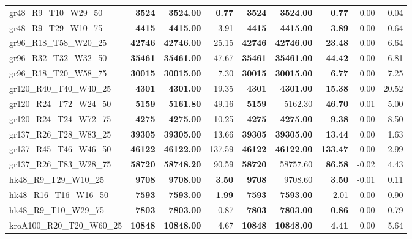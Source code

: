 \documentclass{singlecol-new}
\begin{document}
\begin{scriptsize}
\begin{longtable}{lrrrrrrrr}
		gr48\_R9\_T10\_W29\_50 & \textbf{3524} & \textbf{3524.00} & \textbf{0.77} & \textbf{3524} & \textbf{3524.00} & \textbf{0.77} & 0.00 & 0.04 \\
		gr48\_R9\_T29\_W10\_75 & \textbf{4415} & \textbf{4415.00} & 3.91 & \textbf{4415} & \textbf{4415.00} & \textbf{3.89} & 0.00 & 0.64 \\
		gr96\_R18\_T58\_W20\_25 & \textbf{42746} & \textbf{42746.00} & 25.15 & \textbf{42746} & \textbf{42746.00} & \textbf{23.48} & 0.00 & 6.64 \\
		gr96\_R32\_T32\_W32\_50 & \textbf{35461} & \textbf{35461.00} & 47.67 & \textbf{35461} & \textbf{35461.00} & \textbf{44.42} & 0.00 & 6.81 \\
		gr96\_R18\_T20\_W58\_75 & \textbf{30015} & \textbf{30015.00} & 7.30 & \textbf{30015} & \textbf{30015.00} & \textbf{6.77} & 0.00 & 7.25 \\
		gr120\_R40\_T40\_W40\_25 & \textbf{4301} & \textbf{4301.00} & 19.35 & \textbf{4301} & \textbf{4301.00} & \textbf{15.38} & 0.00 & 20.52 \\
		gr120\_R24\_T72\_W24\_50 & \textbf{5159} & \textbf{5161.80} & 49.16 & \textbf{5159} & 5162.30 & \textbf{46.70} & -0.01 & 5.00 \\
		gr120\_R24\_T24\_W72\_75 & \textbf{4275} & \textbf{4275.00} & 10.25 & \textbf{4275} & \textbf{4275.00} & \textbf{9.38} & 0.00 & 8.50 \\
		gr137\_R26\_T28\_W83\_25 & \textbf{39305} & \textbf{39305.00} & 13.66 & \textbf{39305} & \textbf{39305.00} & \textbf{13.44} & 0.00 & 1.63 \\
		gr137\_R45\_T46\_W46\_50 & \textbf{46122} & \textbf{46122.00} & 137.59 & \textbf{46122} & \textbf{46122.00} & \textbf{133.47} & 0.00 & 2.99 \\
		gr137\_R26\_T83\_W28\_75 & \textbf{58720} & \textbf{58748.20} & 90.59 & \textbf{58720} & 58757.60 & \textbf{86.58} & -0.02 & 4.43 \\
		hk48\_R9\_T29\_W10\_25 & \textbf{9708} & \textbf{9708.00} & \textbf{3.50} & \textbf{9708} & 9708.60 & \textbf{3.50} & -0.01 & 0.11 \\
		hk48\_R16\_T16\_W16\_50 & \textbf{7593} & \textbf{7593.00} & \textbf{1.99} & \textbf{7593} & \textbf{7593.00} & 2.01 & 0.00 & -0.90 \\
		hk48\_R9\_T10\_W29\_75 & \textbf{7803} & \textbf{7803.00} & 0.87 & \textbf{7803} & \textbf{7803.00} & \textbf{0.86} & 0.00 & 0.79 \\
		kroA100\_R20\_T20\_W60\_25 & \textbf{10848} & \textbf{10848.00} & 4.67 & \textbf{10848} & \textbf{10848.00} & \textbf{4.41} & 0.00 & 5.64 \\

\end{longtable}
\end{scriptsize}
\end{document}
